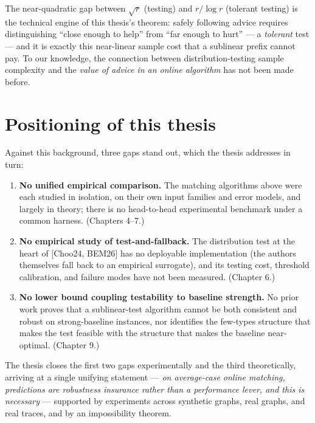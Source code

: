The near-quadratic gap between \(\sqrt r\) (testing) and \(r/\log r\) (tolerant testing) is the
technical engine of this thesis's theorem: safely following advice requires distinguishing
``close enough to help'' from ``far enough to hurt'' --- a \emph{tolerant} test --- and it is exactly
this near-linear sample cost that a sublinear prefix cannot pay. To our knowledge, the
connection between distribution-testing sample complexity and the \emph{value of advice in an
online algorithm} has not been made before.

\section{Positioning of this thesis}\label{positioning-of-this-thesis}

Against this background, three gaps stand out, which the thesis addresses in turn:

\begin{enumerate}
\def\labelenumi{\arabic{enumi}.}
\tightlist
\item
  \textbf{No unified empirical comparison.} The matching algorithms above were each studied in
  isolation, on their own input families and error models, and largely in theory; there is
  no head-to-head experimental benchmark under a common harness. (Chapters 4--7.)
\item
  \textbf{No empirical study of test-and-fallback.} The distribution test at the heart of
  {[}Choo24, BEM26{]} has no deployable implementation (the authors themselves fall back to an
  empirical surrogate), and its testing cost, threshold calibration, and failure modes have
  not been measured. (Chapter 6.)
\item
  \textbf{No lower bound coupling testability to baseline strength.} No prior work proves that a
  sublinear-test algorithm cannot be both consistent and robust on strong-baseline
  instances, nor identifies the few-types structure that makes the test feasible with the
  structure that makes the baseline near-optimal. (Chapter 9.)
\end{enumerate}

The thesis closes the first two gaps experimentally and the third theoretically, arriving at
a single unifying statement --- \emph{on average-case online matching, predictions are robustness
insurance rather than a performance lever, and this is necessary} --- supported by experiments
across synthetic graphs, real graphs, and real traces, and by an impossibility theorem.
